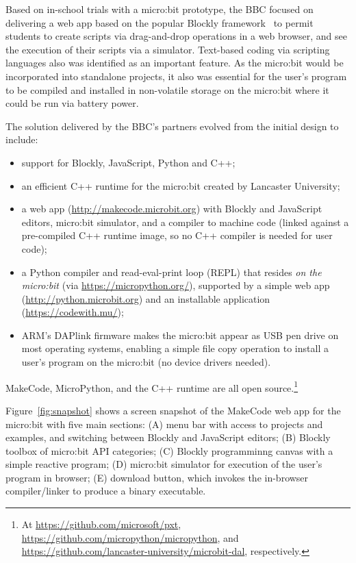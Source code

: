 Based on in-school trials with a micro:bit prototype, the BBC focused on delivering a web app 
based on the popular Blockly framework~\cite{Blocky2015} to permit students to
create scripts via drag-and-drop operations in a web browser, and see
the execution of their scripts via a simulator.
Text-based coding via scripting languages also 
was identified as an important feature. As the micro:bit would be incorporated 
into standalone projects, it also was essential for the user's program to be 
compiled and installed in non-volatile storage on the micro:bit where it 
could be run via battery power.


The solution delivered by the BBC's partners evolved from the initial
design to include:
\begin{itemize}
\item support for Blockly, JavaScript, Python and C++;
\item an efficient C++ runtime for the micro:bit created by Lancaster
University;
\item a web app (\url{http://makecode.microbit.org})
with Blockly and JavaScript editors, micro:bit simulator, 
and a compiler to machine code (linked against a pre-compiled 
C++ runtime image, so no C++ compiler is needed for user code);
\item a Python compiler and read-eval-print loop (REPL) that resides
{\em on the micro:bit} (via \url{https://micropython.org/}), 
supported by a simple web app (\url{http://python.microbit.org}) and 
an installable application (\url{https://codewith.mu/});
\item ARM's DAPlink firmware makes the micro:bit appear as USB pen drive 
on most operating systems, enabling a simple file copy operation to 
install a user's program on the micro:bit (no device drivers needed).
\end{itemize}
MakeCode, MicroPython, and the C++ runtime are all open source.\footnote{
At \url{https://github.com/microsoft/pxt},
\url{https://github.com/micropython/micropython},
and \url{https://github.com/lancaster-university/microbit-dal}, 
respectively.}

Figure~\ref{fig:snapshot} shows a screen snapshot of the MakeCode web app
for the micro:bit with five main sections: (A) menu bar with access to projects
and examples, and switching between Blockly and JavaScript editors; (B)
Blockly toolbox of micro:bit API categories; (C) Blockly programminng
canvas with a simple reactive program; (D) micro:bit simulator for execution
of the user's program in browser; (E) download button, which invokes the in-browser
compiler/linker to produce a binary executable. 


